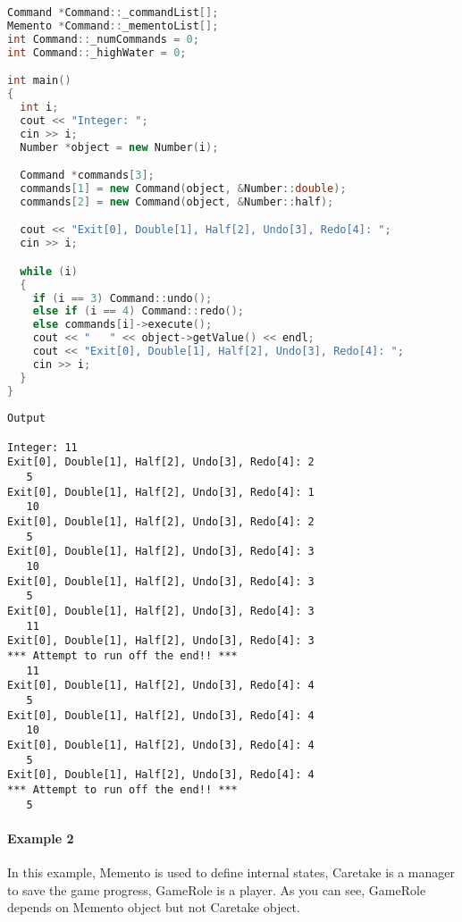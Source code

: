\documentclass{book}
\begin{document}
\begin{lstlisting}[caption={Memento Pattern example 1}, language=C++]
Command *Command::_commandList[];
Memento *Command::_mementoList[];
int Command::_numCommands = 0;
int Command::_highWater = 0;

int main()
{
  int i;
  cout << "Integer: ";
  cin >> i;
  Number *object = new Number(i);

  Command *commands[3];
  commands[1] = new Command(object, &Number::double);
  commands[2] = new Command(object, &Number::half);

  cout << "Exit[0], Double[1], Half[2], Undo[3], Redo[4]: ";
  cin >> i;

  while (i)
  {
    if (i == 3) Command::undo();
    else if (i == 4) Command::redo();
    else commands[i]->execute();
    cout << "   " << object->getValue() << endl;
    cout << "Exit[0], Double[1], Half[2], Undo[3], Redo[4]: ";
    cin >> i;
  }
}
\end{lstlisting}
\begin{verbatim}
Output

Integer: 11
Exit[0], Double[1], Half[2], Undo[3], Redo[4]: 2
   5
Exit[0], Double[1], Half[2], Undo[3], Redo[4]: 1
   10
Exit[0], Double[1], Half[2], Undo[3], Redo[4]: 2
   5
Exit[0], Double[1], Half[2], Undo[3], Redo[4]: 3
   10
Exit[0], Double[1], Half[2], Undo[3], Redo[4]: 3
   5
Exit[0], Double[1], Half[2], Undo[3], Redo[4]: 3
   11
Exit[0], Double[1], Half[2], Undo[3], Redo[4]: 3
*** Attempt to run off the end!! ***
   11
Exit[0], Double[1], Half[2], Undo[3], Redo[4]: 4
   5
Exit[0], Double[1], Half[2], Undo[3], Redo[4]: 4
   10
Exit[0], Double[1], Half[2], Undo[3], Redo[4]: 4
   5
Exit[0], Double[1], Half[2], Undo[3], Redo[4]: 4
*** Attempt to run off the end!! ***
   5
\end{verbatim}
\paragraph{Example 2}
In this example, Memento is used to define internal states, Caretake is a manager to save the game progress, GameRole is a player.
As you can see, GameRole depends on Memento object but not Caretake object.
\end{document}
